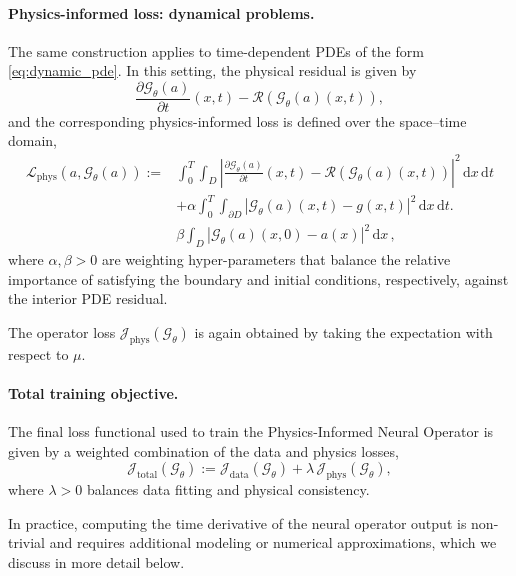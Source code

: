 \documentclass[final,1p,times]{elsarticle}
\theoremstyle{definition}
\newcommand{\abs}[1]{\left| #1 \right|}
\newcommand{\Gt}{\mathcal{G}_{\theta}}
\newcommand{\Lphys}{\mathcal{L}_{\mathrm{phys}}}
\newcommand{\Jdata}{\mathcal{J}_{\mathrm{data}}}
\newcommand{\Jphys}{\mathcal{J}_{\mathrm{phys}}}
\newcommand{\Jtot}{\mathcal{J}_{\mathrm{total}}}
\begin{document}
\paragraph{Physics-informed loss: dynamical problems.}
The same construction applies to time-dependent PDEs of the form \eqref{eq:dynamic_pde}.
In this setting, the physical residual is given by
\begin{equation}
    \frac{\partial \Gt(a)}{\partial t}(x,t) - \mathcal{R}(\Gt(a)(x,t)),
\end{equation}
and the corresponding physics-informed loss is defined over the space--time domain,
\begin{equation}
    \begin{aligned}
        \Lphys(a, \Gt(a))
        :=& \int_0^T \int_D 
        \abs{
            \frac{\partial \Gt(a)}{\partial t}(x,t)
            - \mathcal{R}(\Gt(a)(x,t))
        }^2 \, \mathrm{d}x \, \mathrm{d}t \\
        & + \alpha\int_0^T \int_{\partial D} 
        \abs{
            \Gt(a)(x,t)
            - g(x,t)
        }^2
        \, \mathrm{d}x \, \mathrm{d}t.\\
        & \beta \int_D \abs{
        \Gt(a)(x,0)-a(x)
        }^2\, \mathrm{d}x \, ,
    \end{aligned}  
\end{equation}
where $\alpha, \beta > 0$ are weighting hyper-parameters that balance the relative importance of satisfying the boundary and initial conditions, respectively, against the interior PDE residual.

The operator loss $\Jphys(\Gt)$ is again obtained by taking the expectation with respect to $\mu$.

\paragraph{Total training objective.}
The final loss functional used to train the Physics-Informed Neural Operator is given by a weighted combination of the data and physics losses,
\begin{equation}
    \Jtot(\Gt)
    := \Jdata(\Gt) + \lambda \, \Jphys(\Gt),
\end{equation}
where $\lambda > 0$ balances data fitting and physical consistency.

In practice, computing the time derivative of the neural operator output is non-trivial and requires additional modeling or numerical approximations, which we discuss in more detail below.
\end{document}

